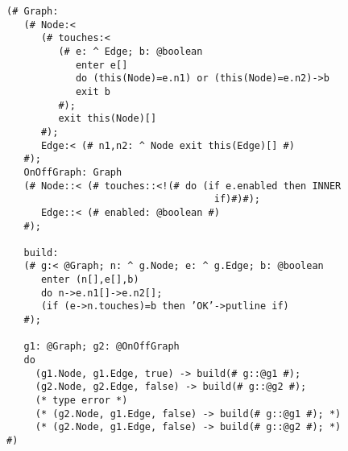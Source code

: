 \documentclass{beamer}
\begin{document}
\begin{frame}[fragile]{}
\begin{verbatim}
(# Graph:
   (# Node:<
      (# touches:<
         (# e: ^ Edge; b: @boolean
            enter e[]
            do (this(Node)=e.n1) or (this(Node)=e.n2)->b
            exit b
         #);
         exit this(Node)[]
      #);
      Edge:< (# n1,n2: ^ Node exit this(Edge)[] #)
   #);
   OnOffGraph: Graph
   (# Node::< (# touches::<!(# do (if e.enabled then INNER
                                    if)#)#);
      Edge::< (# enabled: @boolean #)
   #);

   build:
   (# g:< @Graph; n: ^ g.Node; e: ^ g.Edge; b: @boolean
      enter (n[],e[],b)
      do n->e.n1[]->e.n2[];
      (if (e->n.touches)=b then ’OK’->putline if)
   #);

   g1: @Graph; g2: @OnOffGraph
   do
     (g1.Node, g1.Edge, true) -> build(# g::@g1 #);
     (g2.Node, g2.Edge, false) -> build(# g::@g2 #);
     (* type error *)
     (* (g2.Node, g1.Edge, false) -> build(# g::@g1 #); *)
     (* (g2.Node, g1.Edge, false) -> build(# g::@g2 #); *)
#)
\end{verbatim}
\end{frame}
\end{document}
